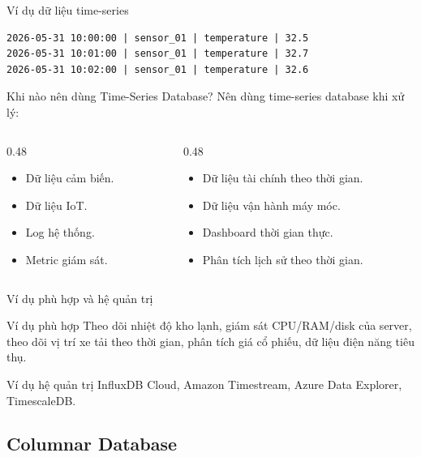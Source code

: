 \documentclass[aspectratio=169,11pt]{beamer}
\newcommand{\smallitem}{\setlength{\itemsep}{2pt}\setlength{\parskip}{0pt}}
\begin{document}
\begin{frame}[fragile]{Ví dụ dữ liệu time-series}
\small
\begin{verbatim}
2026-05-31 10:00:00 | sensor_01 | temperature | 32.5
2026-05-31 10:01:00 | sensor_01 | temperature | 32.7
2026-05-31 10:02:00 | sensor_01 | temperature | 32.6
\end{verbatim}
\end{frame}

\begin{frame}{Khi nào nên dùng Time-Series Database?}
Nên dùng time-series database khi xử lý:
\begin{columns}[T]
\begin{column}{0.48\textwidth}
\begin{itemize}
  \smallitem
  \item Dữ liệu cảm biến.
  \item Dữ liệu IoT.
  \item Log hệ thống.
  \item Metric giám sát.
\end{itemize}
\end{column}
\begin{column}{0.48\textwidth}
\begin{itemize}
  \smallitem
  \item Dữ liệu tài chính theo thời gian.
  \item Dữ liệu vận hành máy móc.
  \item Dashboard thời gian thực.
  \item Phân tích lịch sử theo thời gian.
\end{itemize}
\end{column}
\end{columns}
\end{frame}

\begin{frame}{Ví dụ phù hợp và hệ quản trị}
\begin{block}{Ví dụ phù hợp}
Theo dõi nhiệt độ kho lạnh, giám sát CPU/RAM/disk của server, theo dõi vị trí xe tải theo thời gian, phân tích giá cổ phiếu, dữ liệu điện năng tiêu thụ.
\end{block}

\begin{block}{Ví dụ hệ quản trị}
InfluxDB Cloud, Amazon Timestream, Azure Data Explorer, TimescaleDB.
\end{block}
\end{frame}

\subsection{Columnar Database}
\end{document}
